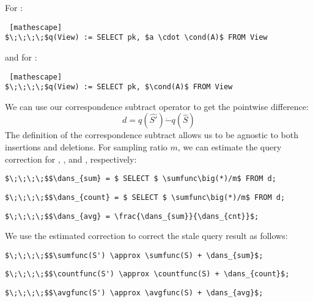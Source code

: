 \vspace{.5em}

\noindent For \sumfunc:
\begin{lstlisting} [mathescape]
$\;\;\;\;$q(View) := SELECT pk, $a \cdot \cond(A)$ FROM View
\end{lstlisting}

\noindent and for \countfunc:
\begin{lstlisting} [mathescape]
$\;\;\;\;$q(View) := SELECT pk, $\cond(A)$ FROM View
\end{lstlisting}

We can use our correspondence subtract operator to get the pointwise difference:
\[d = q(\hat{S'}) \dot{-} q(\hat{S})\]  
The definition of the correspondence subtract allows us to be agnostic to both insertions and deletions.
For sampling ratio $m$, we can estimate the query correction for \sumfunc, \countfunc, and \avgfunc, respectively:
\begin{lstlisting}[mathescape,basicstyle={\scriptsize}]
$\;\;\;\;$$\dans_{sum} = $ SELECT $ \sumfunc\big(*)/m$ FROM d;
\end{lstlisting}
\vspace{-1em}
\begin{lstlisting}[mathescape,basicstyle={\scriptsize}]
$\;\;\;\;$$\dans_{count} = $ SELECT $ \sumfunc\big(*)/m$ FROM d;
\end{lstlisting}
\vspace{-1em}
\begin{lstlisting}[mathescape,basicstyle={\scriptsize}]
$\;\;\;\;$$\dans_{avg} = \frac{\dans_{sum}}{\dans_{cnt}}$;
\end{lstlisting}
We use the estimated correction to correct the stale query result as follows:
\begin{lstlisting}[mathescape,basicstyle={\scriptsize}]
$\;\;\;\;$$\sumfunc(S') \approx \sumfunc(S) + \dans_{sum}$;
\end{lstlisting}
\vspace{-1em}
\begin{lstlisting}[mathescape,basicstyle={\scriptsize}]
$\;\;\;\;$$\countfunc(S') \approx \countfunc(S) + \dans_{count}$;
\end{lstlisting}
\vspace{-1em}
\begin{lstlisting}[mathescape,basicstyle={\scriptsize}]
$\;\;\;\;$$\avgfunc(S') \approx \avgfunc(S) + \dans_{avg}$;
\end{lstlisting}

